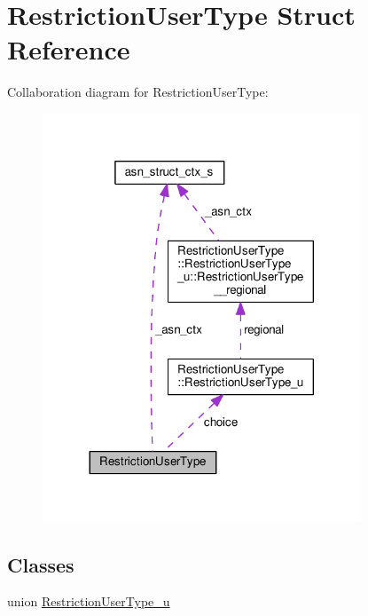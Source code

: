 \hypertarget{structRestrictionUserType}{}\section{Restriction\+User\+Type Struct Reference}
\label{structRestrictionUserType}


Collaboration diagram for Restriction\+User\+Type\+:\nopagebreak
\begin{figure}[H]
\begin{center}
\leavevmode
\includegraphics[width=269pt]{structRestrictionUserType__coll__graph}
\end{center}
\end{figure}
\subsection*{Classes}
\begin{DoxyCompactItemize}
\item 
union \hyperlink{unionRestrictionUserType_1_1RestrictionUserType__u}{Restriction\+User\+Type\+\_\+u}
\end{DoxyCompactItemize}
